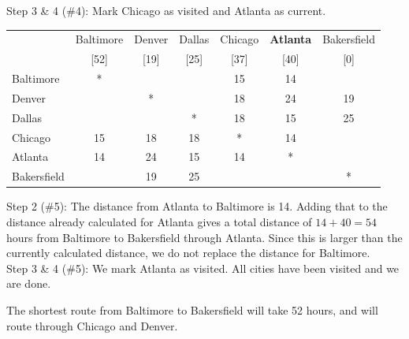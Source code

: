\begin{example}{}
\noindent Step 3 \& 4 (\#4):  Mark Chicago as visited and Atlanta as current.

 \begin{center}
 \begin{tabular}{|l|c|c|c|c|c|c|}
 \hline
 & Baltimore & \cellcolor{yellow}Denver &  \cellcolor{yellow}Dallas &  \cellcolor{yellow}Chicago & \textbf{Atlanta} & \cellcolor{yellow}Bakersfield\\
 &[52]& \cellcolor{yellow}[19]& \cellcolor{yellow}[25]& \cellcolor{yellow}[37]&[40]&\cellcolor{yellow}[0]\\
 \hline
 Baltimore & * & \cellcolor{yellow}& \cellcolor{yellow}& \cellcolor{yellow}15&14&\cellcolor{yellow}\\
 \hline
 \cellcolor{yellow} Denver & \cellcolor{yellow}& \cellcolor{yellow}*& \cellcolor{yellow}& \cellcolor{yellow}18& \cellcolor{yellow}24&\cellcolor{yellow}19\\
 \hline
 \cellcolor{yellow}Dallas& \cellcolor{yellow}& \cellcolor{yellow}& \cellcolor{yellow}*& \cellcolor{yellow}18& \cellcolor{yellow}15&\cellcolor{yellow}25\\
 \hline
  \cellcolor{yellow}Chicago & \cellcolor{yellow}15& \cellcolor{yellow}18& \cellcolor{yellow}18& \cellcolor{yellow}*& \cellcolor{yellow}14&\cellcolor{yellow}\\
 \hline
 Atlanta & 14 &  \cellcolor{yellow}24& \cellcolor{yellow}15& \cellcolor{yellow}14&*&\cellcolor{yellow}\\
 \hline
 \cellcolor{yellow}Bakersfield &\cellcolor{yellow}&\cellcolor{yellow}19&\cellcolor{yellow}25&\cellcolor{yellow}&\cellcolor{yellow}&\cellcolor{yellow}*\\
 \hline
 \end{tabular}
 \end{center}

\noindent Step 2 (\#5):  The distance from Atlanta to Baltimore is 14.  Adding that to the distance already calculated for Atlanta gives a total distance of $14+40 = 54$ hours from Baltimore to Bakersfield through Atlanta.  Since this is larger than the currently calculated distance, we do not replace the distance for Baltimore.\\

\noindent Step 3 \& 4 (\#5):  We mark Atlanta as visited.  All cities have been visited and we are done.  

The shortest route from Baltimore to Bakersfield will take 52 hours, and will route through Chicago and Denver.
\end{example}


